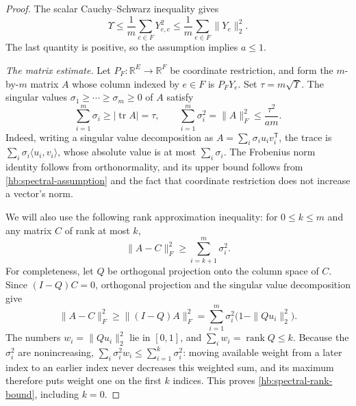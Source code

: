 \documentclass[11pt]{amsart}
\theoremstyle{definition}
\theoremstyle{remark}
\numberwithin{equation}{section}
\begin{document}
\begin{proof}
The scalar Cauchy--Schwarz inequality gives
\[
 \Upsilon\le\frac1m\sum_{e\in F}Y_{e,e}^2
 \le\frac1m\sum_{e\in F}\|Y_e\|_2^2.
\]
The last quantity is positive, so the assumption implies \(a\le1\).

 
 \emph{The matrix estimate.}
Let \(P_F:\mathbb R^E\to\mathbb R^F\) be coordinate restriction, and form the
\(m\)-by-\(m\) matrix \(A\) whose column indexed by \(e\in F\)
is \(P_FY_e\).  Set \(\tau=m\sqrt\Upsilon\).
The singular values \(\sigma_1\ge\cdots\ge\sigma_m\ge0\) of \(A\)
satisfy
\begin{equation}\label{hb:spectral-matrix-bounds}
 \sum_{i=1}^m\sigma_i\ge|\operatorname{tr} A|=\tau,
 \qquad
 \sum_{i=1}^m\sigma_i^2=\|A\|_F^2
 \le\frac{\tau^2}{am}.
\end{equation}
Indeed, writing a singular value decomposition as
\(A=\sum_i\sigma_i u_i v_i^{\mathsf T}\), the trace is
\(\sum_i\sigma_i\langle u_i,v_i\rangle\), whose absolute value
is at most \(\sum_i\sigma_i\).  The Frobenius norm identity follows
from orthonormality, and its upper bound follows from
\eqref{hb:spectral-assumption} and the fact that coordinate restriction
does not increase a vector's norm.

We will also use the following rank approximation inequality:
for \(0\le k\le m\) and any matrix \(C\) of rank at most \(k\),
\begin{equation}\label{hb:spectral-rank-bound}
 \|A-C\|_F^2\ge\sum_{i=k+1}^m\sigma_i^2.
\end{equation}
For completeness, let \(Q\) be orthogonal projection onto the column
space of \(C\).  Since \((I-Q)C=0\), orthogonal projection and the
singular value decomposition give
\[
 \|A-C\|_F^2
 \ge\|(I-Q)A\|_F^2
 =\sum_{i=1}^m\sigma_i^2\bigl(1-\|Qu_i\|_2^2\bigr).
\]
The numbers \(w_i=\|Qu_i\|_2^2\) lie in \([0,1]\), and
\(\sum_iw_i=\operatorname{rank} Q\le k\).
Because the \(\sigma_i^2\) are nonincreasing,
\(\sum_i\sigma_i^2w_i\le\sum_{i=1}^k\sigma_i^2\):
moving available weight from a later index to an earlier index never
decreases this weighted sum, and its maximum therefore puts weight one
on the first \(k\) indices.  This proves
\eqref{hb:spectral-rank-bound}, including \(k=0\).


\end{proof}
\end{document}

